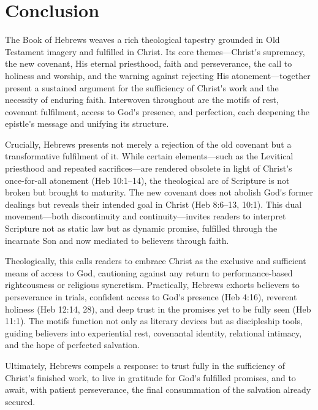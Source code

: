 \documentclass[12pt]{article}
\def\apos{^^27}         %
\def\christ{the Messiah}
\def\christ{Christ}
\begin{document}
\section{Conclusion}
The Book of Hebrews weaves a rich theological tapestry grounded in Old Testament
imagery and fulfilled in \christ{}.
%
Its core themes---\christ{}\apos{}s supremacy, the new covenant, His eternal
priesthood, faith and perseverance, the call to holiness and worship, and the
warning against rejecting His atonement---together present a sustained argument
for the sufficiency of \christ{}\apos{}s work and the necessity of enduring
faith.
%
Interwoven throughout are the motifs of rest, covenant fulfilment, access to
God\apos{}s presence, and perfection, each deepening the epistle\apos{}s message
and unifying its structure.

Crucially, Hebrews presents not merely a rejection of the old covenant but a
transformative fulfilment of it. While certain elements---such as the Levitical
priesthood and repeated sacrifices---are rendered obsolete in light of
\christ{}\apos{}s once-for-all atonement (Heb 10:1–14), the theological arc of
Scripture is not broken but brought to maturity. The new covenant does not
abolish God\apos{}s former dealings but reveals their intended goal in \christ{}
(Heb 8:6–13, 10:1).
%
This dual movement—both discontinuity and continuity—invites readers to
interpret Scripture not as static law but as dynamic promise, fulfilled through
the incarnate Son and now mediated to believers through faith.

Theologically, this calls readers to embrace \christ{} as the exclusive and
sufficient means of access to God, cautioning against any return to
performance-based righteousness or religious syncretism. Practically, Hebrews
exhorts believers to perseverance in trials, confident access to God\apos{}s
presence (Heb 4:16), reverent holiness (Heb 12:14, 28), and deep trust in the
promises yet to be fully seen (Heb 11:1). The motifs function not only as
literary devices but as discipleship tools, guiding believers into experiential
rest, covenantal identity, relational intimacy, and the hope of perfected
salvation.

Ultimately, Hebrews compels a response: to trust fully in the sufficiency of
\christ{}\apos{}s finished work, to live in gratitude for God\apos{}s fulfilled
promises, and to await, with patient perseverance, the final consummation of the
salvation already secured.

\printbibliography[title=Bibliography]
\end{document}

